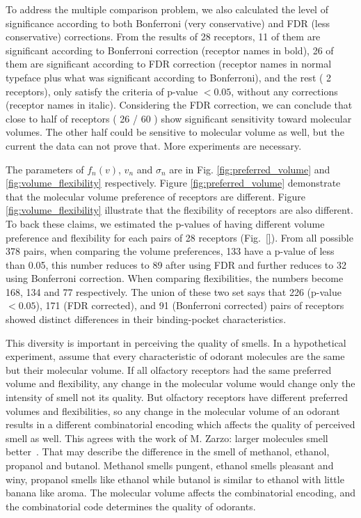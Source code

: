 \documentclass[11pt]{paper} %
\newcommand{\numberofreceptors}{ 28 }
\newcommand{\bonferroni}{ 11 }
\newcommand{\fdr}{ 26 }
\newcommand{\nocorrection}{ 2 }
\begin{document}
To address the multiple comparison problem, 
we also calculated the level of significance according to both Bonferroni (very conservative) and FDR (less conservative) corrections. 
From the results of \numberofreceptors receptors, 
\bonferroni of them are significant according to Bonferroni correction (receptor names in bold), 
\fdr of them are significant according to FDR correction 
(receptor names in normal typeface plus what was significant according to Bonferroni), 
and the rest (\nocorrection receptors), 
only satisfy the criteria of  p-value $<0.05$, without any corrections (receptor names in italic).
Considering the FDR correction, 
we can conclude that close to half of receptors (\fdr / 60 ) show significant sensitivity toward molecular volumes. 
The other half could be sensitive to molecular volume as well, but the current the data can not prove that.
More experiments are necessary.

The parameters of $f_n(v)$, $v_n$ and $\sigma_n$ are in Fig. \ref{fig:preferred_volume} and \ref{fig:volume_flexibility} respectively.
Figure \ref{fig:preferred_volume} demonstrate that the molecular volume preference of receptors are different. 
Figure \ref{fig:volume_flexibility} illustrate that the flexibility of receptors are also different.
To back these claims, 
we estimated the p-values of having different volume preference and flexibility for each pairs of \numberofreceptors receptors
(Fig.~\ref{}). 
From all possible 378 pairs, 
when comparing the volume preferences, 
133 have a p-value of less than 0.05, 
this number reduces to 89 after using FDR and further reduces to 32 using Bonferroni correction.
When comparing flexibilities, 
the numbers become 168, 134 and 77 respectively. 
The union of these two set says that 226 (p-value $<0.05$), 171 (FDR corrected), and 91 (Bonferroni corrected) pairs of receptors showed distinct differences in their binding-pocket characteristics.

This diversity is important in perceiving the quality of smells. 
In a hypothetical experiment, 
assume that every characteristic of odorant molecules are the same but their molecular volume.
If all olfactory receptors had the same preferred volume and flexibility, 
any change in the molecular volume would change only the intensity of smell not its quality.
But olfactory receptors have different preferred volumes and flexibilities, 
so any change in the molecular volume of an odorant results in a different combinatorial encoding which affects the quality of perceived smell as well. 
This agrees with the work of M. Zarzo: larger molecules  smell better~\cite{}.
That may describe the difference in the smell of methanol, ethanol, propanol and butanol. 
Methanol smells pungent, ethanol smells pleasant and winy, propanol smells like ethanol while butanol is similar to ethanol with little banana like aroma.
The molecular volume affects the combinatorial encoding, 
and the combinatorial code determines the quality of odorants.
\end{document}
